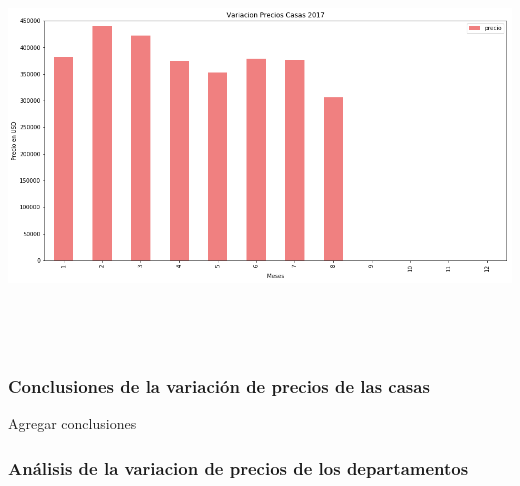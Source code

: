 \documentclass[a4paper, 10pt]{article}
\begin{document}
      \begin{center}
            \includegraphics[width=6in, height=4.2in]{images/vCasas2017}
      \end{center}

      \subsubsection{Conclusiones de la variación de precios de las casas}

      Agregar conclusiones

      \subsubsection{Análisis de la variacion de precios de los departamentos}
\end{document}
